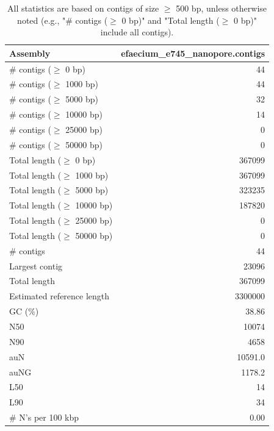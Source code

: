 \documentclass[12pt,a4paper]{article}
\begin{document}
\begin{table}[ht]
\begin{center}
\caption{All statistics are based on contigs of size $\geq$ 500 bp, unless otherwise noted (e.g., "\# contigs ($\geq$ 0 bp)" and "Total length ($\geq$ 0 bp)" include all contigs).}
\begin{tabular}{|l*{1}{|r}|}
\hline
Assembly & efaecium\_e745\_nanopore.contigs \\ \hline
\# contigs ($\geq$ 0 bp) & 44 \\ \hline
\# contigs ($\geq$ 1000 bp) & 44 \\ \hline
\# contigs ($\geq$ 5000 bp) & 32 \\ \hline
\# contigs ($\geq$ 10000 bp) & 14 \\ \hline
\# contigs ($\geq$ 25000 bp) & 0 \\ \hline
\# contigs ($\geq$ 50000 bp) & 0 \\ \hline
Total length ($\geq$ 0 bp) & 367099 \\ \hline
Total length ($\geq$ 1000 bp) & 367099 \\ \hline
Total length ($\geq$ 5000 bp) & 323235 \\ \hline
Total length ($\geq$ 10000 bp) & 187820 \\ \hline
Total length ($\geq$ 25000 bp) & 0 \\ \hline
Total length ($\geq$ 50000 bp) & 0 \\ \hline
\# contigs & 44 \\ \hline
Largest contig & 23096 \\ \hline
Total length & 367099 \\ \hline
Estimated reference length & 3300000 \\ \hline
GC (\%) & 38.86 \\ \hline
N50 & 10074 \\ \hline
N90 & 4658 \\ \hline
auN & 10591.0 \\ \hline
auNG & 1178.2 \\ \hline
L50 & 14 \\ \hline
L90 & 34 \\ \hline
\# N's per 100 kbp & 0.00 \\ \hline
\end{tabular}
\end{center}
\end{table}
\end{document}
